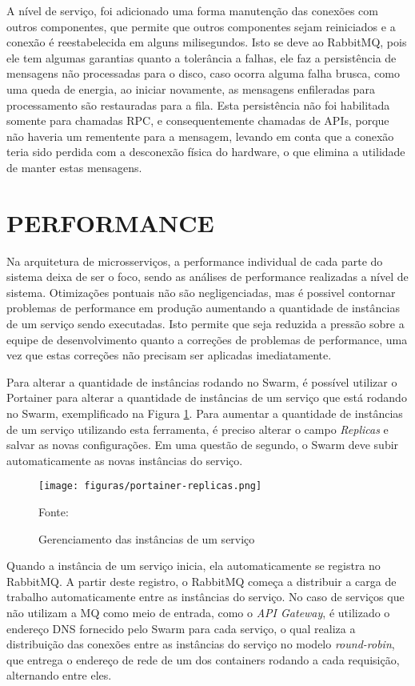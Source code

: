 A nível de serviço, foi adicionado uma forma manutenção das conexões com
outros componentes, que permite que outros componentes sejam reiniciados e
a conexão é reestabelecida em alguns milisegundos. Isto se deve ao RabbitMQ,
pois ele tem algumas garantias quanto a tolerância a falhas, ele faz a
persistência de mensagens não processadas para o disco, caso ocorra alguma
falha brusca, como uma queda de energia, ao iniciar novamente, as mensagens
enfileradas para processamento são restauradas para a fila. Esta persistência
não foi habilitada somente para chamadas \ac{RPC}, e consequentemente
chamadas de \acp{API}, porque não haveria um rementente para a mensagem,
levando em conta que a conexão teria sido perdida com a desconexão física
do hardware, o que elimina a utilidade de manter estas mensagens.

\section{PERFORMANCE}

Na arquitetura de microsserviços, a performance individual de cada parte
do sistema deixa de ser o foco, sendo as análises de performance realizadas
a nível de sistema. Otimizações pontuais não são negligenciadas, mas é
possivel contornar problemas de performance em produção aumentando a
quantidade de instâncias de um serviço sendo executadas. Isto permite que
seja reduzida a pressão sobre a equipe de desenvolvimento quanto a correções
de problemas de performance, uma vez que estas correções não precisam ser
aplicadas imediatamente.

Para alterar a quantidade de instâncias rodando no Swarm, é possível utilizar
o Portainer para alterar a quantidade de instâncias de um serviço que está
rodando no Swarm, exemplificado na Figura \ref{fig:portainer-replicas}.
Para aumentar a quantidade de instâncias de um serviço utilizando esta
ferramenta, é preciso alterar o campo \emph{Replicas} e salvar as novas
configurações. Em uma questão de segundo, o Swarm deve subir
automaticamente as novas instâncias do serviço.

\begin{figure}[H]
	\centering
	\caption{Gerenciamento das instâncias de um serviço}
	\texttt{[image: figuras/portainer-replicas.png]}

	\label{fig:portainer-replicas}
	\footnotesize Fonte: \fonteOAutor
\end{figure}

Quando a instância de um serviço inicia, ela automaticamente se registra
no RabbitMQ. A partir deste registro, o RabbitMQ começa a distribuir a carga
de trabalho automaticamente entre as instâncias do serviço. No caso de
serviços que não utilizam a \ac{MQ} como meio de entrada, como o
\emph{API Gateway}, é utilizado o endereço \ac{DNS} fornecido pelo Swarm
para cada serviço, o qual realiza a distribuição das conexões entre as
instâncias do serviço no modelo \emph{round-robin}, que entrega o
endereço de rede de um dos containers rodando a cada requisição, alternando
entre eles.

